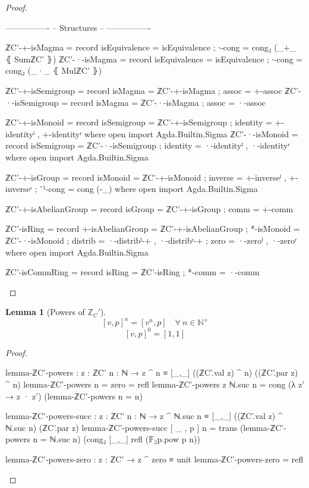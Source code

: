 \documentclass[a4paper]{report}
\theoremstyle{definition}
\theoremstyle{lemma}
\newtheorem{lemma}{Lemma}
\theoremstyle{theorem}
\newcommand\bN{\mathbb{N}}
\newcommand\bZ{\mathbb{Z}}
\begin{document}
\begin{proof}
\begin{code}
  ----------------
  -- Structures --
  ----------------

  ℤC'-+-isMagma = record
    { isEquivalence = isEquivalence
    ; ∙-cong        =  cong₂ (_+_ ⦃ SumℤC' ⦄)
    }
  ℤC'-·-isMagma = record
    { isEquivalence = isEquivalence
    ; ∙-cong        =  cong₂ (_·_ ⦃ MulℤC' ⦄)
    }

  ℤC'-+-isSemigroup = record
    { isMagma = ℤC'-+-isMagma
    ; assoc   = +-assoc
    }
  ℤC'-·-isSemigroup = record
    { isMagma = ℤC'-·-isMagma
    ; assoc   = ·-assoc
    }

  ℤC'-+-isMonoid = record
    { isSemigroup = ℤC'-+-isSemigroup
    ; identity    = +-identityˡ , +-identityʳ
    }
    where open import Agda.Builtin.Sigma
  ℤC'-·-isMonoid = record
    { isSemigroup = ℤC'-·-isSemigroup
    ; identity    = ·-identityˡ , ·-identityʳ
    }
    where open import Agda.Builtin.Sigma

  ℤC'-+-isGroup = record
    { isMonoid = ℤC'-+-isMonoid
    ; inverse  = +-inverseˡ , +-inverseʳ
    ; ⁻¹-cong  = cong (-_)
    }
    where open import Agda.Builtin.Sigma

  ℤC'-+-isAbelianGroup = record
    { isGroup = ℤC'-+-isGroup
    ; comm    = +-comm
    }

  ℤC'-isRing = record
    { +-isAbelianGroup = ℤC'-+-isAbelianGroup
    ; *-isMonoid       = ℤC'-·-isMonoid
    ; distrib          = ·-distribˡ-+ , ·-distribʳ-+
    ; zero             = ·-zeroˡ , ·-zeroʳ
    }
    where open import Agda.Builtin.Sigma

  ℤC'-isCommRing = record
    { isRing = ℤC'-isRing
    ; *-comm = ·-comm
    }
  \end{code}
\end{proof}

\begin{lemma}[Powers of $\bZ_C'$]
  \[[v,p]^n = [v^n,p]\quad\forall\ n\in\bN^+\]
  \[[v,p]^0 = [1,1]\]
\end{lemma}
\begin{proof}~\\
  \begin{code}
lemma-ℤC'-powers : {z : ℤC'} {n : ℕ}
  → z ^ n ≡ [_,_] ((ℤC'.val z) ^ n) ((ℤC'.par z) ^ n)
lemma-ℤC'-powers {n = zero}    = refl
lemma-ℤC'-powers {z} {ℕ.suc n} = cong (λ z' → z · z') (lemma-ℤC'-powers {n = n})

lemma-ℤC'-powers-succ : {z : ℤC'} {n : ℕ}
  → z ^ ℕ.suc n ≡ [_,_] ((ℤC'.val z) ^ ℕ.suc n) (ℤC'.par z)
lemma-ℤC'-powers-succ {[ _ , p ]} {n}
  = trans (lemma-ℤC'-powers {n = ℕ.suc n}) (cong₂ [_,_] refl (𝔽₂p.pow p n))

lemma-ℤC'-powers-zero : {z : ℤC'} → z ^ zero ≡ unit
lemma-ℤC'-powers-zero = refl
\end{code}
\end{proof}
\end{document}
